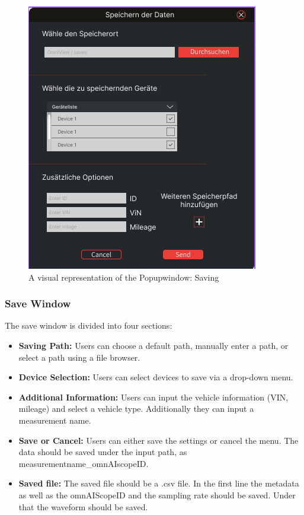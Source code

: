 \documentclass[]{scrreprt}
\begin{document}
\begin{figure}
    \includegraphics[width=.9\textwidth]{assets/pictures/Popupwindow_png.png}
    \caption[]{A visual representation of the Popupwindow: Saving}
    \label{fig:SavingWindow}
    \end{figure}

\subsubsection{Save Window}
The save window is divided into four sections:
\begin{itemize}
\item \textbf{Saving Path:} Users can choose a default path, manually enter a path, or select a path using a file browser.
\item \textbf{Device Selection:} Users can select devices to save via a drop-down menu.
\item \textbf{Additional Information:} Users can input the vehicle information (VIN, mileage) and select a vehicle type. Additionally they can input a measurement name.
\item \textbf{Save or Cancel:} Users can either save the settings or cancel the menu. The data should be saved under the input path, as measurementname_omnAIscopeID. 
\item \textbf{Saved file:} The saved file should be a .csv file. In the first line the metadata as well as the omnAIScopeID and the sampling rate should be saved. 
                            Under that the waveform should be saved. 
\end{itemize}
\end{document}
